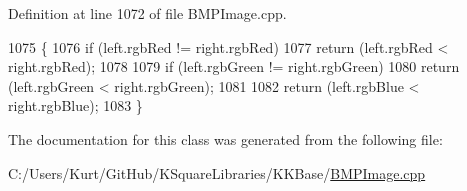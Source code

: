 Definition at line 1072 of file B\+M\+P\+Image.\+cpp.


\begin{DoxyCode}
1075     \{
1076       \textcolor{keywordflow}{if}  (left.rgbRed != right.rgbRed)
1077         \textcolor{keywordflow}{return} (left.rgbRed < right.rgbRed);
1078 
1079       \textcolor{keywordflow}{if}  (left.rgbGreen != right.rgbGreen)
1080         \textcolor{keywordflow}{return} (left.rgbGreen < right.rgbGreen);
1081       
1082       \textcolor{keywordflow}{return}  (left.rgbBlue < right.rgbBlue);
1083     \}
\end{DoxyCode}


The documentation for this class was generated from the following file\+:\begin{DoxyCompactItemize}
\item 
C\+:/\+Users/\+Kurt/\+Git\+Hub/\+K\+Square\+Libraries/\+K\+K\+Base/\hyperlink{_b_m_p_image_8cpp}{B\+M\+P\+Image.\+cpp}\end{DoxyCompactItemize}
